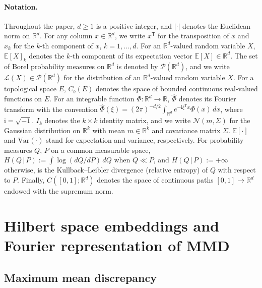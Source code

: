 \documentclass[11pt,leqno]{article}
\theoremstyle{plain}
\theoremstyle{remark}
\theoremstyle{definition}
\numberwithin{equation}{section}
\numberwithin{figure}{section}
\numberwithin{table}{section}
\numberwithin{algorithm}{section}
\newcommand{\EE}{\mathbb{E}}
\newcommand{\RR}{\mathbb{R}}
\newcommand{\cP}{\mathcal{P}}
\begin{document}
\paragraph{Notation.}
Throughout the paper, $d\ge 1$ is a positive integer,
and $|\cdot|$ denotes the Euclidean norm on $\RR^d$. 
For any column $x\in\RR^d$, we write $x^{\mathsf{T}}$ for the transposition of $x$ 
and $x_k$ for the $k$-th component of $x$, $k=1,\ldots,d$.
For an $\RR^d$-valued random variable $X$, $\EE[X]_k$ denotes the $k$-th component
of its expectation vector $\EE[X]\in\RR^d$.
The set of Borel probability measures on $\RR^d$ is denoted by $\cP(\RR^d)$,
and we write $\mathcal{L}(X)\in\cP(\RR^d)$ for the distribution of an $\RR^d$-valued random variable $X$.
For a topological space $E$, $C_b(E)$ denotes the space of bounded continuous real-valued functions on $E$.
For an integrable function $\Phi:\RR^d\to\RR$,
$\widehat{\Phi}$ denotes its Fourier transform with the convention
$\widehat{\Phi}(\xi)=(2\pi)^{-d/2}\int_{\RR^d}e^{-\mathrm{i}\xi^{\mathsf{T}}x}\Phi(x)\,dx$,
where $\mathrm{i}=\sqrt{-1}$.
$I_k$ denotes the $k\times k$ identity matrix,
and we write $\mathcal{N}(m,\Sigma)$ for the Gaussian distribution on $\RR^k$ with mean $m\in\RR^k$ and covariance matrix $\Sigma$.
$\EE[\cdot]$ and $\mathrm{Var}(\cdot)$ stand for expectation and variance, respectively. 
For probability measures $Q$, $P$ on a common measurable space,
$H(Q\,|\,P):=\int\log(dQ/dP)\,dQ$ when $Q\ll P$, and $H(Q\,|\,P):=+\infty$ otherwise,
is the Kullback--Leibler divergence (relative entropy) of $Q$ with respect to $P$.
Finally, $C([0,1];\RR^d)$ denotes the space of continuous paths $[0,1]\to\RR^d$
endowed with the supremum norm.


\section{Hilbert space embeddings and Fourier representation of MMD}\label{sec:2}

\subsection{Maximum mean discrepancy}\label{sec:2.1}
\end{document}
